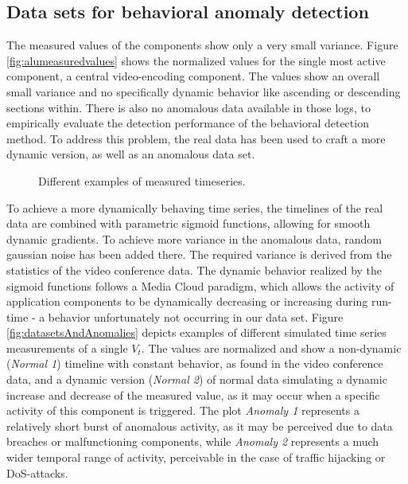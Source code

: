 \documentclass{llncs}
\begin{document}
\subsection{Data sets for behavioral anomaly detection}
\label{subsec:datasets_behavioral}
The measured values of the components show only a very small variance. Figure \ref{fig:alumeasuredvalues} shows the normalized values for the single most active component, a central video-encoding component. The values show an overall small variance and no specifically dynamic behavior like ascending or descending sections within. There is also no anomalous data available in those logs, to empirically evaluate the detection performance of the behavioral detection method. To address this problem, the real data has been used to craft a more dynamic version, as well as an anomalous data set.

\begin{figure}
\vspace{-4mm}
\hfill
{}
\caption{Different examples of measured timeseries.}
\vspace{-2mm}
\end{figure}

To achieve a more dynamically behaving time series, the timelines of the real data are combined with parametric sigmoid functions, allowing for smooth dynamic gradients. To achieve more variance in the anomalous data, random gaussian noise has been added there. The required variance is derived from the statistics of the video conference data. The dynamic behavior realized by the sigmoid functions follows a Media Cloud paradigm, which allows the activity of application components to be dynamically decreasing or increasing during run-time - a behavior unfortunately not occurring in our data set. Figure \ref{fig:datasetsAndAnomalies} depicts examples of different simulated time series measurements of a single $V_t$. The values are normalized and show a non-dynamic (\textit{Normal 1}) timeline with constant behavior, as found in the video conference data, and a dynamic version (\textit{Normal 2}) of normal data simulating a dynamic increase and decrease of the measured value, as it may occur when a specific activity of this component is triggered. The plot \textit{Anomaly 1} represents a relatively short burst of anomalous activity, as it may be perceived due to data breaches or malfunctioning components, while \textit{Anomaly 2} represents a much wider temporal range of activity, perceivable in the case of traffic hijacking or DoS-attacks.
 
\end{document}
